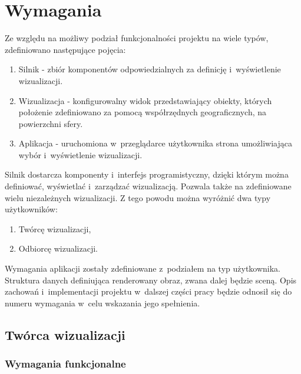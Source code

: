 \chapter{Wymagania}

Ze względu na możliwy podział funkcjonalności projektu na wiele typów, zdefiniowano następujące pojęcia:
\begin{enumerate}
    \item Silnik - zbiór komponentów odpowiedzialnych za definicję i~wyświetlenie wizualizacji.
    \item Wizualizacja - konfigurowalny widok przedstawiający obiekty, których położenie zdefiniowano za pomocą współrzędnych geograficznych, na powierzchni sfery.
    \item Aplikacja - uruchomiona w~przeglądarce użytkownika strona umożliwiająca wybór i~wyświetlenie wizualizacji.
\end{enumerate} 

Silnik dostarcza komponenty i~interfejs programistyczny, dzięki którym można definiować, wyświetlać i~zarządzać wizualizacją.
Pozwala także na zdefiniowane wielu niezależnych wizualizacji. Z tego powodu można wyróżnić dwa typy użytkowników:

\begin{enumerate}
    \item Twórcę wizualizacji,
    \item Odbiorcę wizualizacji.
\end{enumerate}

Wymagania aplikacji zostały zdefiniowane z~podziałem na typ użytkownika.
Struktura danych definiująca renderowany obraz, zwana dalej będzie sceną. Opis zachowań i~implementacji projektu w~dalszej części pracy będzie odnosił się do numeru wymagania w~celu wskazania jego spełnienia.

\newcommand{\req}[3]{
    \stepcounter{#2}
    #1\_\arabic{#2} & #3 \\
    \hline
}

\section{Twórca wizualizacji}

\subsection{Wymagania funkcjonalne}


